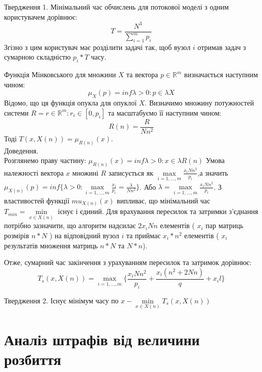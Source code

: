 Твердження 1.
Мінімальний час обчислень для потокової моделі з одним користувачем дорівнює:
\begin{equation}
	\label{eq:lema1}
	T = \frac{N^{3}}{\sum_{i=1}^{m}p_i}
\end{equation}
Згізно з цим користувач має розділити задачі так, щоб вузол $i$ отримав задач з сумарною складністю $p_i*T$ часу.

Функція Мінковського для множини $X$ та вектора $p \in \mathbb{R}^m$ визначається наступним чином:
\begin{equation}
	\mu_X(p) = inf {\lambda > 0 : p \in \lambda X}
\end{equation}
Відомо, що ця функція опукла для опуклої $X$.
Визначимо множину потужностей системи $R = {r \in \mathbb{R}^m : r_i \in [0, p_i]}$ та масштабуємо її наступним чином:
\begin{equation}
	R(n) = \frac{R}{Nn^2}
\end{equation}
Тоді $ T(x, X(n)) = \mu_{R(n)}(x) $.
\\
Доведення.
\\
Розглянемо праву частину: $\mu_{R(n)}(x) = inf {\lambda > 0 : x \in \lambda R(n)}$ Умова належності вектора $x$ множині $R$ записується як $\max\limits_{i=1,\ldots,m} \frac{x_i Nn^2}{p_i}$,а значить $\mu_{X(n)}(p) = inf \big\{ \lambda > 0 : \max\limits_{i=1,\ldots,m} \frac{x_i}{p_i} = \frac{\lambda}{Nn^2} \big\}$. Або $\lambda = \max\limits_{i=1,\ldots,m} \frac{x_i Nn^2}{p_i}$. З властивостей функції $mu_{X(n)}(x)$ випливає, що мінімальний час $T_{min} = \min\limits_{x \in X(n)} $ існує і єдиний. Для врахування пересилок та затримки з'єднання потрібно зазначити, що алгоритм надсилає $2x_iNn$ елементів ( $x_i$ пар матриць розмірів $n*N$ ) на відповідний вузол $i$ та приймає $x_i*n^2$ елементів ( $x_i$ результатів множення матриць $n*N$ та $N*n$).

Отже, сумарний час закінчення з урахуванням пересилок та затримок дорівнює:
\begin{equation}
	\label{eq:main_time}
	T_s(x,X(n)) = \max\limits_{i=1,\ldots,m} \bigg\{ \frac{x_i N n^2}{p_i} + \frac{x_i (n^2 + 2 N n )}{q} + x_i l \bigg\}
\end{equation}

Твердження 2. Існує мінімум часу по $x - \min\limits_{x \in X(n)} T_s(x, X(n))$

\section{Аналіз штрафів від величини розбиття}


